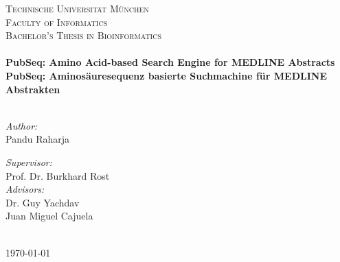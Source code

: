 \documentclass[12pt, twoside]{Thesis} %
\begin{document}
\begin{titlepage}
\begin{center}

\textsc{\Large Technische Universit\"at M\"unchen}\\[.5cm] %
\textsc{\Large Faculty of Informatics}\\[1.5cm] %
\textsc{\Large Bachelor's Thesis in Bioinformatics}\\[0.5cm] %

\HRule \\[0.4cm] %
{\Large \bfseries PubSeq: Amino Acid-based Search Engine for MEDLINE Abstracts}\\[0.4cm] %
{\Large \bfseries PubSeq: Aminosäuresequenz basierte Suchmachine für MEDLINE Abstrakten}\\[0.4cm] %
\HRule \\[1.5cm] %
 
\begin{minipage}{0.4\textwidth}
\begin{flushleft} \large
\emph{Author:}\\
Pandu Raharja
\end{flushleft}
\end{minipage}
\begin{minipage}{0.4\textwidth}
\begin{flushright} \large
\emph{Supervisor:} \\
Prof. Dr. Burkhard Rost\\
\emph{Advisors:} \\
Dr. Guy Yachdav \\
Juan Miguel Cajuela
\end{flushright}
\end{minipage}\\[3cm]
 
 
{\large \today}\\[4cm] %
 
\vfill
\end{center}

\end{titlepage}
\end{document}

